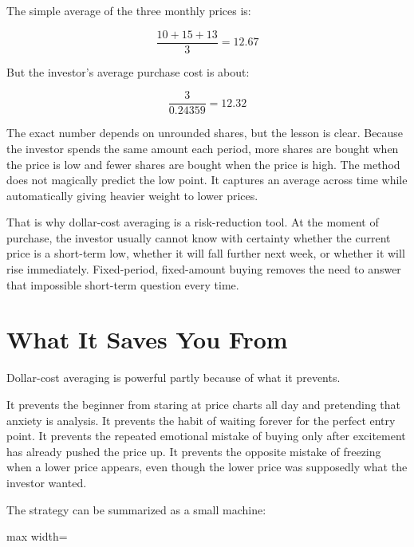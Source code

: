 The simple average of the three monthly prices is:

\[
\frac{10+15+13}{3}=12.67
\]

But the investor's average purchase cost is about:

\[
\frac{3}{0.24359}=12.32
\]

The exact number depends on unrounded shares, but the lesson is clear. Because the investor spends the same amount each period, more shares are bought when the price is low and fewer shares are bought when the price is high. The method does not magically predict the low point. It captures an average across time while automatically giving heavier weight to lower prices.

That is why dollar-cost averaging is a risk-reduction tool. At the moment of purchase, the investor usually cannot know with certainty whether the current price is a short-term low, whether it will fall further next week, or whether it will rise immediately. Fixed-period, fixed-amount buying removes the need to answer that impossible short-term question every time.

\section*{What It Saves You From}

Dollar-cost averaging is powerful partly because of what it prevents.

It prevents the beginner from staring at price charts all day and pretending that anxiety is analysis. It prevents the habit of waiting forever for the perfect entry point. It prevents the repeated emotional mistake of buying only after excitement has already pushed the price up. It prevents the opposite mistake of freezing when a lower price appears, even though the lower price was supposedly what the investor wanted.

The strategy can be summarized as a small machine:

\begin{center}
\begin{adjustbox}{max width=\linewidth}
\end{adjustbox}
\end{center}

